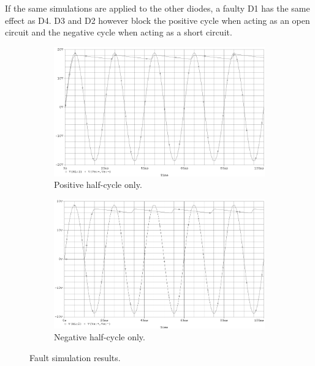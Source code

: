 \documentclass[12pt]{article}
\begin{document}
If the same simulations are applied to the other diodes, a faulty D1 has the same effect as D4. D3 and D2 however block the positive cycle when acting as an open circuit and the negative cycle when acting as a short circuit.
\begin{figure}[h!]
\centering
\begin{subfigure}[b]{0.65\textwidth}
\includegraphics[width=\textwidth]{out_pos}
\caption{Positive half-cycle only.}
\label{fig:pos}
\end{subfigure}
\qquad
\begin{subfigure}[b]{0.65\textwidth}
\includegraphics[width=\textwidth]{out_neg}
\caption{Negative half-cycle only.}
\label{fig:neg}
\end{subfigure}
\caption{Fault simulation results.}
\label{fig:fault}
\end{figure}
\end{document}
